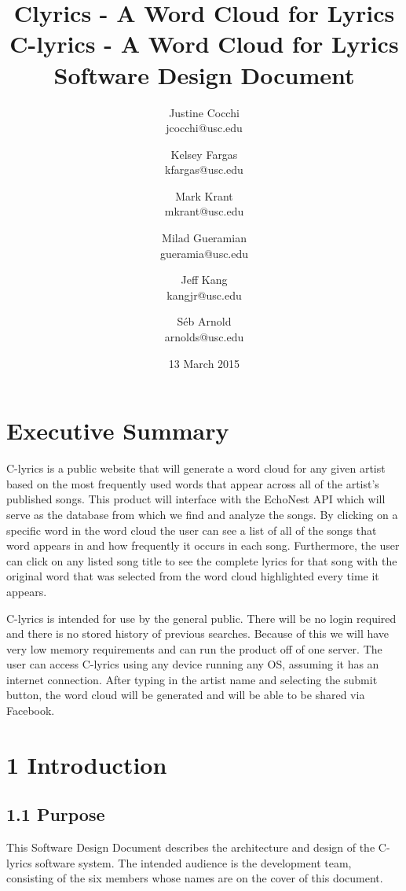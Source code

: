 \documentclass[]{article}
\title{Clyrics - A Word Cloud for Lyrics}
\author{Justine Cocchi\\jcocchi@usc.edu \and Kelsey Fargas\\kfargas@usc.edu \and Mark Krant \\ mkrant@usc.edu\and Milad Gueramian\\gueramia@usc.edu \and Jeff Kang\\kangjr@usc.edu \and Séb Arnold\\arnolds@usc.edu}
\date{13 March 2015}
\title{%
	C-lyrics - A Word Cloud for Lyrics \\
	\large Software Design Document}
\begin{document}
\clearpage\maketitle
\thispagestyle{empty}

\pagebreak

\tableofcontents
\setcounter{tocdepth}{3}
\thispagestyle{empty}

\pagebreak

\section{Executive Summary}\label{executive-summary}

C-lyrics is a public website that will generate a word cloud for any
given artist based on the most frequently used words that appear across
all of the artist's published songs. This product will interface with
the EchoNest API which will serve as the database from which we find and
analyze the songs. By clicking on a specific word in the word cloud the
user can see a list of all of the songs that word appears in and how
frequently it occurs in each song. Furthermore, the user can click on
any listed song title to see the complete lyrics for that song with the
original word that was selected from the word cloud highlighted every
time it appears.

C-lyrics is intended for use by the general public. There will be no
login required and there is no stored history of previous searches.
Because of this we will have very low memory requirements and can run
the product off of one server. The user can access C-lyrics using any
device running any OS, assuming it has an internet connection. After
typing in the artist name and selecting the submit button, the word
cloud will be generated and will be able to be shared via Facebook.

\pagebreak

\section{1 Introduction}\label{introduction}

\subsection{1.1 Purpose}\label{purpose}

This Software Design Document describes the architecture and design of
the C-lyrics software system. The intended audience is the development
team, consisting of the six members whose names are on the cover of this
document.
\end{document}
